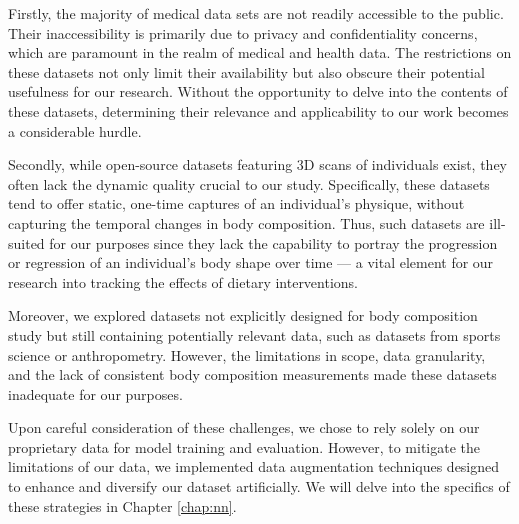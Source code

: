 Firstly, the majority of medical data sets are not readily accessible to the
public. Their inaccessibility is primarily due to privacy and confidentiality
concerns, which are paramount in the realm of medical and health data. The
restrictions on these datasets not only limit their availability but also
obscure their potential usefulness for our research. Without the opportunity to
delve into the contents of these datasets, determining their relevance and
applicability to our work becomes a considerable hurdle.

Secondly, while open-source datasets featuring 3D scans of individuals exist,
they often lack the dynamic quality crucial to our study. Specifically, these
datasets tend to offer static, one-time captures of an individual's physique,
without capturing the temporal changes in body composition. Thus, such datasets
are ill-suited for our purposes since they lack the capability to portray the
progression or regression of an individual's body shape over time — a vital
element for our research into tracking the effects of dietary interventions.

Moreover, we explored datasets not explicitly designed for body composition
study but still containing potentially relevant data, such as datasets from
sports science or anthropometry. However, the limitations in scope, data
granularity, and the lack of consistent body composition measurements made
these datasets inadequate for our purposes.

Upon careful consideration of these challenges, we chose to rely solely on our
proprietary data for model training and evaluation. However, to mitigate the
limitations of our data, we implemented data augmentation techniques designed
to enhance and diversify our dataset artificially. We will delve into the
specifics of these strategies in Chapter \ref{chap:nn}.